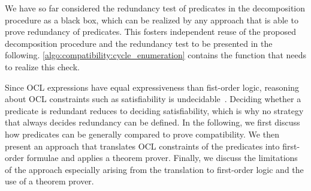 We have so far considered the redundancy test of predicates in the decomposition procedure as a black box, which can be realized by any approach that is able to prove redundancy of predicates.
This fosters independent reuse of the proposed decomposition procedure and the redundancy test to be presented in the following.
\autoref{algo:compatibility:cycle_enumeration} contains the function  that needs to realize this check.

Since \gls{OCL} expressions have equal expressiveness than fist-order logic, reasoning about \gls{OCL} constraints such as satisfiability is undecidable~\cite{beckert2002ocltranslation}.
Deciding whether a predicate is redundant reduces to deciding satisfiability, which is why no strategy that always decides redundancy can be defined.
In the following, we first discuss how predicates can be generally compared to prove compatibility.
We then present an approach that translates \gls{OCL} constraints of the predicates into first-order formulae and applies a theorem prover.
Finally, we discuss the limitations of the approach especially arising from the translation to first-order logic and the use of a theorem prover.



